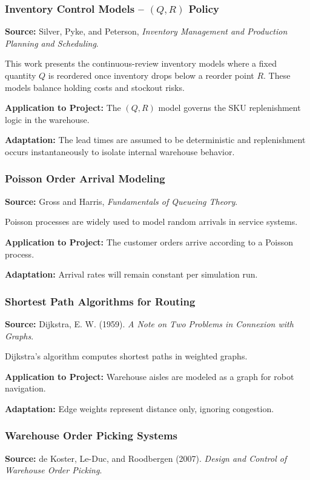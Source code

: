 \documentclass[onecolumn,12pt]{IEEEtran}
\begin{document}
\subsubsection{Inventory Control Models -- $(Q, R)$ Policy}
\textbf{Source:} Silver, Pyke, and Peterson, \emph{Inventory Management and Production Planning and Scheduling}.

This work presents the continuous-review inventory models where a fixed quantity $Q$ is reordered once inventory drops below a reorder point $R$. These models balance holding costs and stockout risks.

\textbf{Application to Project:} The $(Q, R)$ model governs the SKU replenishment logic in the warehouse.

\textbf{Adaptation:} The lead times are assumed to be deterministic and replenishment occurs instantaneously to isolate internal warehouse behavior.

\subsubsection{Poisson Order Arrival Modeling}
\textbf{Source:} Gross and Harris, \emph{Fundamentals of Queueing Theory}.

Poisson processes are widely used to model random arrivals in service systems.

\textbf{Application to Project:} The customer orders arrive according to a Poisson process.

\textbf{Adaptation:} Arrival rates will remain constant per simulation run.

\subsubsection{Shortest Path Algorithms for Routing}
\textbf{Source:} Dijkstra, E. W. (1959). \emph{A Note on Two Problems in Connexion with Graphs}.

Dijkstra’s algorithm computes shortest paths in weighted graphs.

\textbf{Application to Project:} Warehouse aisles are modeled as a graph for robot navigation.

\textbf{Adaptation:} Edge weights represent distance only, ignoring congestion.

\subsubsection{Warehouse Order Picking Systems}
\textbf{Source:} de Koster, Le-Duc, and Roodbergen (2007). \emph{Design and Control of Warehouse Order Picking}.
\end{document}
